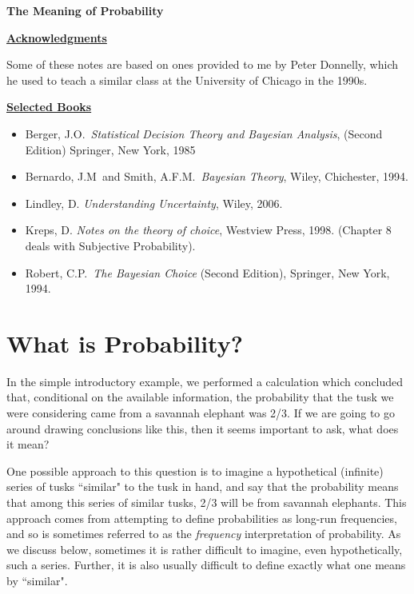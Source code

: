 \documentclass{article}[11pt]
\begin{document}


\begin{center}
\Large\bf The Meaning of Probability
\end{center}
\vskip 6mm
\normalsize

\underline{\Large{\bf Acknowledgments}}
\bigskip

% 
Some of these notes are based on ones provided to me by Peter Donnelly,
which he used to teach a similar class at the University of Chicago in the 1990s.
\vskip 6mm

\underline{\Large{\bf Selected Books}}
\bigskip
\begin{itemize}
\item Berger, J.O.\ {\it Statistical Decision Theory and Bayesian Analysis}, (Second Edition) Springer, New York, 1985
\item Bernardo, J.M\ and Smith, A.F.M.\ {\it Bayesian Theory}, Wiley, Chichester, 1994.
\item Lindley, D. {\it Understanding Uncertainty}, Wiley, 2006.
\item Kreps, D. {\it Notes on the theory of choice}, Westview Press, 1998. (Chapter 8 deals with Subjective Probability).
\item Robert, C.P.\ {\it The Bayesian Choice} (Second Edition), Springer, New York, 1994.
\end{itemize}

\section{What is Probability?}

In the simple introductory example, we performed a calculation which
concluded that, conditional on the available information, 
the probability that the tusk we were considering came from a savannah elephant was 2/3. If we are going to go around drawing conclusions like this, then it seems
important to ask, what does it mean?

One possible approach to this question is to imagine a hypothetical (infinite) series of tusks ``similar" to the tusk in hand, and say that the probability means that among this series of similar tusks, 2/3 will be from savannah elephants. This approach comes from attempting to define probabilities as long-run frequencies, and so is sometimes referred to as the {\it frequency} interpretation of probability.
As we discuss below, sometimes it is rather difficult to imagine, even hypothetically, such a series. 
Further, it is also usually difficult to define exactly what one means by ``similar".
\end{document}
